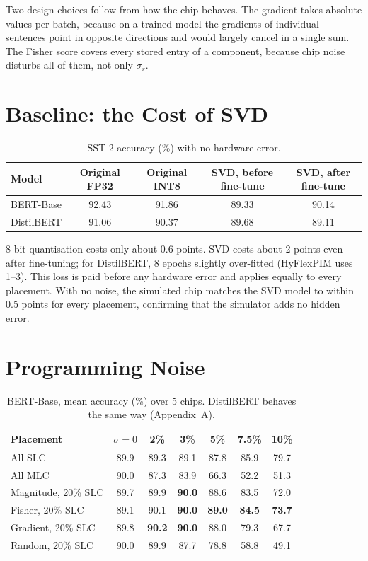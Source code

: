 \documentclass[10pt,a4paper]{article}
\newcommand{\best}[1]{\textcolor{cmag}{\textbf{#1}}}
\begin{document}
\noindent Two design choices follow from how the chip behaves. The gradient takes absolute values per
batch, because on a trained model the gradients of individual sentences point in opposite directions and
would largely cancel in a single sum. The Fisher score covers every stored entry of a component, because
chip noise disturbs all of them, not only $\sigma_r$.

\section{Baseline: the Cost of SVD}

\begin{table}[h]
\centering\small
\begin{tabular}{@{}lcccc@{}}
\toprule
Model & Original FP32 & Original INT8 & SVD, before fine-tune & SVD, after fine-tune \\
\midrule
BERT-Base  & 92.43 & 91.86 & 89.33 & 90.14 \\
DistilBERT & 91.06 & 90.37 & 89.68 & 89.11 \\
\bottomrule
\end{tabular}
\caption{SST-2 accuracy (\%) with no hardware error.}
\end{table}

8-bit quantisation costs only about 0.6 points. SVD costs about 2 points even after fine-tuning; for
DistilBERT, 8 epochs slightly over-fitted (HyFlexPIM uses 1--3). This loss is paid before any hardware
error and applies equally to every placement. With no noise, the simulated chip matches the SVD model to
within 0.5 points for every placement, confirming that the simulator adds no hidden error.

\section{Programming Noise}

\begin{table}[h]
\centering\small
\begin{tabular}{@{}lcccccc@{}}
\toprule
Placement & $\sigma=0$ & 2\% & 3\% & 5\% & 7.5\% & 10\% \\
\midrule
All SLC & 89.9 & 89.3 & 89.1 & 87.8 & 85.9 & 79.7 \\
All MLC & 90.0 & 87.3 & 83.9 & 66.3 & 52.2 & 51.3 \\
\midrule
Magnitude, 20\% SLC & 89.7 & 89.9 & \best{90.0} & 88.6 & 83.5 & 72.0 \\
Fisher, 20\% SLC    & 89.1 & 90.1 & \best{90.0} & \best{89.0} & \best{84.5} & \best{73.7} \\
Gradient, 20\% SLC  & 89.8 & \best{90.2} & \best{90.0} & 88.0 & 79.3 & 67.7 \\
Random, 20\% SLC    & 90.0 & 89.9 & 87.7 & 78.8 & 58.8 & 49.1 \\
\bottomrule
\end{tabular}
\caption{BERT-Base, mean accuracy (\%) over 5 chips. DistilBERT behaves the same way (Appendix~A).}
\end{table}
\end{document}
